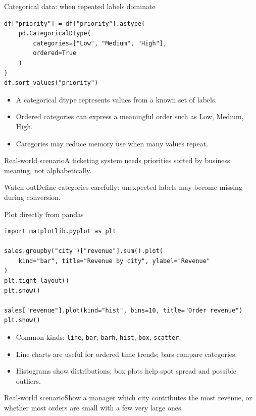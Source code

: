 \documentclass[aspectratio=169,10pt]{beamer}
\newcommand{\scenario}[1]{\begin{block}{Real-world scenario}#1\end{block}}
\newcommand{\pitfall}[1]{\begin{alertblock}{Watch out}#1\end{alertblock}}
\begin{document}
\begin{frame}[fragile]{Categorical data: when repeated labels dominate}
\begin{lstlisting}
df["priority"] = df["priority"].astype(
    pd.CategoricalDtype(
        categories=["Low", "Medium", "High"],
        ordered=True
    )
)
df.sort_values("priority")
\end{lstlisting}
\begin{itemize}
\item A categorical dtype represents values from a known set of labels.
\item Ordered categories can express a meaningful order such as Low, Medium, High.
\item Categories may reduce memory use when many values repeat.
\end{itemize}
\scenario{A ticketing system needs priorities sorted by business meaning, not alphabetically.}
\pitfall{Define categories carefully: unexpected labels may become missing during conversion.}
\end{frame}

\begin{frame}[fragile]{Plot directly from pandas}
\begin{lstlisting}
import matplotlib.pyplot as plt

sales.groupby("city")["revenue"].sum().plot(
    kind="bar", title="Revenue by city", ylabel="Revenue"
)
plt.tight_layout()
plt.show()

sales["revenue"].plot(kind="hist", bins=10, title="Order revenue")
plt.show()
\end{lstlisting}
\begin{itemize}
\item Common kinds: \texttt{line}, \texttt{bar}, \texttt{barh}, \texttt{hist}, \texttt{box}, \texttt{scatter}.
\item Line charts are useful for ordered time trends; bars compare categories.
\item Histograms show distributions; box plots help spot spread and possible outliers.
\end{itemize}
\scenario{Show a manager which city contributes the most revenue, or whether most orders are small with a few very large ones.}
\end{frame}
\end{document}
